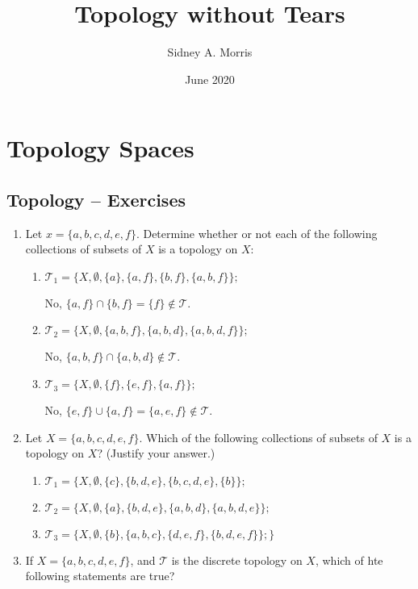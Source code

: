 \documentclass[10pt,a4paper]{report}
\title{Topology without Tears}
\author{Sidney A. Morris}
\date{June 2020}
\newcommand{\TT}{\mathcal{T}}
\begin{document}
\maketitle

\tableofcontents

\chapter{Topology Spaces}
\section{Topology -- Exercises }

\begin{enumerate}
\item Let $x = \{a,b,c,d,e,f\}$.  Determine whether or not each of the following collections of subsets of $X$ is a topology on $X$:
\begin{enumerate}

	\item $\TT_1= \{X, \emptyset, \{a\}, \{a,f\},\{b,f\},\{a,b,f\}\};$
	
	No, $\{a,f\} \cap \{b,f\} = \{f\} \not \in \TT$.
	
	\item $\TT_2 = \{X, \emptyset, \{a,b,f\},\{a,b,d\},\{a,b,d,f\}\};$
	
	No, $\{a,b,f\}\cap\{a,b,d\} \not \in \TT$.
	
	\item $\TT_3 = \{X, \emptyset, \{f\}, \{e,f\}, \{a,f\}\}	;$
	
	No, $\{e,f\} \cup \{a,f\} = \{a,e,f\} \not \in \TT$.
\end{enumerate}

\item Let $X=\{a,b,c,d,e,f\}$.  Which of the following collections of subsets of $X$ is a topology on $X$? (Justify your answer.)

\begin{enumerate}
	\item $\TT_1 = \{X,\emptyset, \{c\},\{b,d,e\}, \{b,c,d,e\}, \{b\}\};$
	\item $\TT_2 = \{X, \emptyset, \{a\}, \{b,d,e\}, \{a,b,d\},\{a,b,d,e\}\};$
	\item $\TT_3 = \{X, \emptyset, \{b\}, \{a,b,c\}, \{d,e,f\}, \{b,d,e,f\}\};\}$
\end{enumerate}

\item If $X=\{a,b,c,d,e,f\}$, and $\TT$ is the discrete topology on $X$, which of hte following statements are true?


\end{enumerate}
\end{document}
